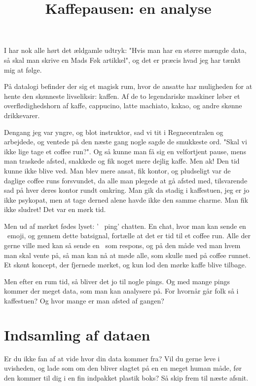\documentclass{article}
\title{Kaffepausen: en analyse}
\author{}
\date{}
\newlength\myheight
\newlength\mydepth
\newcommand*\inlinegraphics[1]{%
  \settototalheight\myheight{Xygp}%
  \settodepth\mydepth{Xygp}%
  \raisebox{-\mydepth}{\texttt{[image: \#1]}}%
}
\newcommand{\coffee}[0]{\inlinegraphics{coffee.png}}
\begin{document}
\maketitle

\noindent
I har nok alle hørt det ældgamle udtryk: "Hvis man har en større mængde data, så skal man skrive en Mads Føk artikkel", og det er præcis hvad jeg har tænkt mig at følge.

På datalogi befinder der sig et magisk rum, hvor de ansatte har muligheden for at hente den skønneste livseliksir: kaffen. Af de to legendariske maskiner løber et overflødighedshorn af kaffe, cappucino, latte machiato, kakao, og andre skønne drikkevarer.

Dengang jeg var yngre, og blot instruktor, sad vi tit i Regnecentralen og arbejdede, og ventede på den næste gang nogle sagde de smukkeste ord. "Skal vi ikke lige tage et coffee run?". Og så kunne man få sig en velfortjent pause, mens man traskede afsted, snakkede og fik noget mere dejlig kaffe. Men ak! Den tid kunne ikke blive ved. Man blev mere ansat, fik kontor, og pludseligt var de daglige coffee runs forsvundet, da alle man plegede at gå afsted med, tilsvarende sad på hver deres kontor rundt omkring. Man gik da stadig i kaffestuen, jeg er jo ikke psykopat, men at tage derned alene havde ikke den samme charme. Man fik ikke sludret! Det var en mørk tid.

Men ud af mørket fødes lyset: '\coffee\ ping' chatten.
En chat, hvor man kan sende en \coffee\ emoji, og gennem dette batsignal, fortælle at det er tid til et coffee run. Alle der gerne ville med kan så sende en \coffee\ som respons, og på den måde ved man hvem man skal vente på, så man kan nå at møde alle, som skulle med på coffee runnet. Et skønt koncept, der fjernede mørket, og kun lod den mørke kaffe blive tilbage.

Men efter en rum tid, så bliver det jo til nogle pings. Og med mange pings kommer der meget data, som man kan analysere på. For hvornår går folk så i kaffestuen? Og hvor mange er man afsted af gangen?


\section*{Indsamling af dataen}

Er du ikke fan af at vide hvor din data kommer fra? Vil du gerne leve i uvisheden, og lade som om den bliver slagtet på en en meget human måde, før den kommer til dig i en fin indpakket plastik boks? Så skip frem til næste afsnit.
\end{document}
